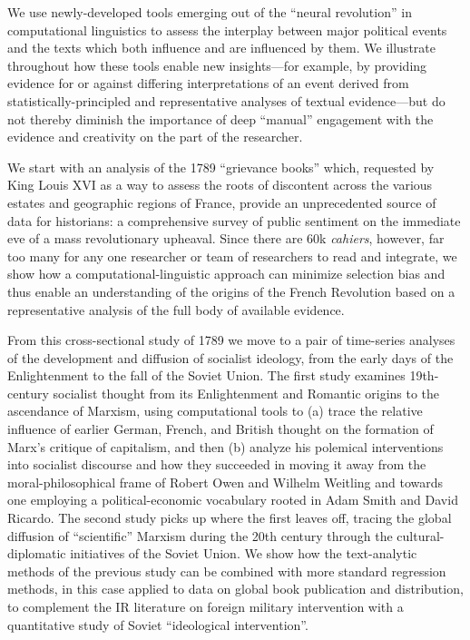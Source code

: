 We use newly-developed tools emerging out of the ``neural revolution'' in computational linguistics to assess the interplay between major political events and the texts which both influence and are influenced by them. We illustrate throughout how these tools enable new insights---for example, by providing evidence for or against differing interpretations of an event derived from statistically-principled and representative analyses of textual evidence---but do not thereby diminish the importance of deep ``manual'' engagement with the evidence and creativity on the part of the researcher.

We start with an analysis of the 1789 ``grievance books'' which, requested by King Louis XVI as a way to assess the roots of discontent across the various estates and geographic regions of France, provide an unprecedented source of data for historians: a comprehensive survey of public sentiment on the immediate eve of a mass revolutionary upheaval. Since there are 60k \textit{cahiers}, however, far too many for any one researcher or team of researchers to read and integrate, we show how a computational-linguistic approach can minimize selection bias and thus enable an understanding of the origins of the French Revolution based on a representative analysis of the full body of available evidence.

From this cross-sectional study of 1789 we move to a pair of time-series analyses of the development and diffusion of socialist ideology, from the early days of the Enlightenment to the fall of the Soviet Union. The first study examines 19th-century socialist thought from its Enlightenment and Romantic origins to the ascendance of Marxism, using computational tools to (a) trace the relative influence of earlier German, French, and British thought on the formation of Marx's critique of capitalism, and then (b) analyze his polemical interventions into socialist discourse and how they succeeded in moving it away from the moral-philosophical frame of Robert Owen and Wilhelm Weitling and towards one employing a political-economic vocabulary rooted in Adam Smith and David Ricardo. The second study picks up where the first leaves off, tracing the global diffusion of ``scientific'' Marxism during the 20th century through the cultural-diplomatic initiatives of the Soviet Union. We show how the text-analytic methods of the previous study can be combined with more standard regression methods, in this case applied to data on global book publication and distribution, to complement the IR literature on foreign military intervention with a quantitative study of Soviet ``ideological intervention''.

